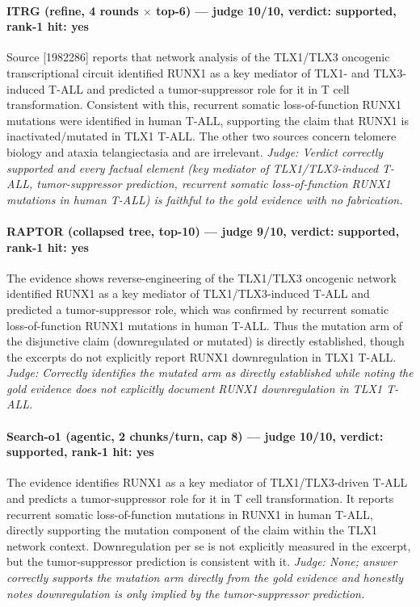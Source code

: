 \documentclass[sigconf, review, anonymous]{acmart}
\begin{document}
\paragraph{ITRG (refine, 4 rounds $\times$ top-6) --- judge 10/10, verdict: supported, rank-1 hit: yes}
\noindent Source [1982286] reports that network analysis of the TLX1/TLX3 oncogenic transcriptional circuit identified RUNX1 as a key mediator of TLX1- and TLX3-induced T-ALL and predicted a tumor-suppressor role for it in T cell transformation. Consistent with this, recurrent somatic loss-of-function RUNX1 mutations were identified in human T-ALL, supporting the claim that RUNX1 is inactivated/mutated in TLX1 T-ALL. The other two sources concern telomere biology and ataxia telangiectasia and are irrelevant.
\noindent\small\textit{Judge: Verdict correctly supported and every factual element (key mediator of TLX1/TLX3-induced T-ALL, tumor-suppressor prediction, recurrent somatic loss-of-function RUNX1 mutations in human T-ALL) is faithful to the gold evidence with no fabrication.}
\paragraph{RAPTOR (collapsed tree, top-10) --- judge 9/10, verdict: supported, rank-1 hit: yes}
\noindent The evidence shows reverse-engineering of the TLX1/TLX3 oncogenic network identified RUNX1 as a key mediator of TLX1/TLX3-induced T-ALL and predicted a tumor-suppressor role, which was confirmed by recurrent somatic loss-of-function RUNX1 mutations in human T-ALL. Thus the mutation arm of the disjunctive claim (downregulated or mutated) is directly established, though the excerpts do not explicitly report RUNX1 downregulation in TLX1 T-ALL.
\noindent\small\textit{Judge: Correctly identifies the mutated arm as directly established while noting the gold evidence does not explicitly document RUNX1 downregulation in TLX1 T-ALL.}
\paragraph{Search-o1 (agentic, 2 chunks/turn, cap 8) --- judge 10/10, verdict: supported, rank-1 hit: yes}
\noindent The evidence identifies RUNX1 as a key mediator of TLX1/TLX3-driven T-ALL and predicts a tumor-suppressor role for it in T cell transformation. It reports recurrent somatic loss-of-function mutations in RUNX1 in human T-ALL, directly supporting the mutation component of the claim within the TLX1 network context. Downregulation per se is not explicitly measured in the excerpt, but the tumor-suppressor prediction is consistent with it.
\noindent\small\textit{Judge: None; answer correctly supports the mutation arm directly from the gold evidence and honestly notes downregulation is only implied by the tumor-suppressor prediction.}
\end{document}
